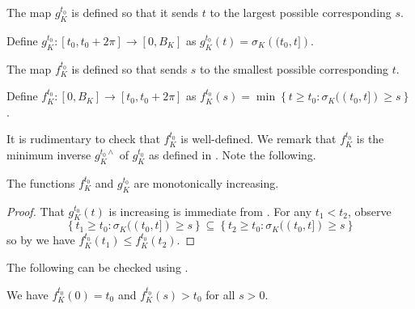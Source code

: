 The map \(g_K^{t_0}\) is defined so that it sends \(t\) to the largest possible corresponding \(s\).

\begin{definition}

Define \(g_K^{t_0} :[t_0, t_0 + 2\pi] \to [0, B_K]\) as \(g_{K}^{t_0}(t) = \sigma_K\left( (t_0, t] \right)\).

\label{def:conversion-ts}
\end{definition}

The map \(f_K^{t_0}\) is defined so that sends \(s\) to the smallest possible corresponding \(t\).

\begin{definition}

Define \(f_K^{t_0} : [0, B_K] \to [t_0, t_0 + 2\pi]\) as \(f_K^{t_0}(s) = \min \left\{ t \geq t_0 : \sigma_K((t_0, t]) \geq s \right\}\).

\label{def:conversion-st}
\end{definition}

It is rudimentary to check that \(f_K^{t_0}\) is well-defined. We remark that \(f_K^{t_0}\) is the minimum inverse \(g_K^{t_0\wedge}\) of \(g_K^{t_0}\) as defined in \autocite{fortelleStudyGeneralizedInverses}. Note the following.

\begin{proposition}

The functions \(f_K^{t_0}\) and \(g_{K}^{t_0}\) are monotonically increasing.

\label{pro:conversion-monotone}
\end{proposition}

\begin{proof}
That \(g_K^{t_0}(t)\) is increasing is immediate from . For any \(t_1 < t_2\), observe
\[
\left\{ t_1 \geq t_0 : \sigma_K((t_0, t]) \geq s \right\} \subseteq \left\{ t_2 \geq t_0 : \sigma_K((t_0, t]) \geq s \right\}
\]
so by  we have \(f_K^{t_0}(t_1) \leq f_K^{t_0}(t_2)\).
\end{proof}

The following can be checked using .

\begin{proposition}

We have \(f_K^{t_0}(0) = t_0\) and \(f_K^{t_0}(s) > t_0\) for all \(s > 0\).

\label{pro:conversion-st-nonzero}
\end{proposition}

